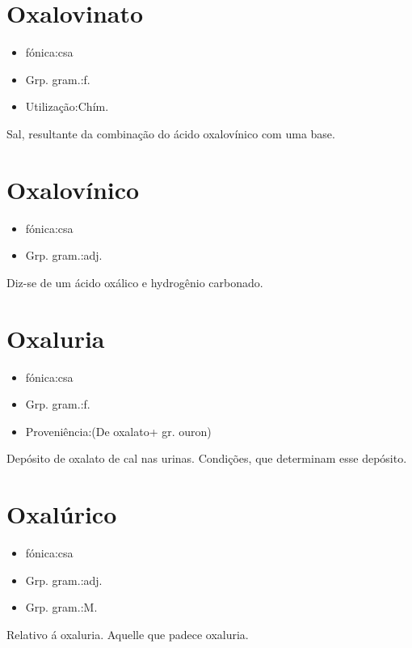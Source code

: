 \section{Oxalovinato}
\begin{itemize}
\item {fónica:csa}
\end{itemize}
\begin{itemize}
\item {Grp. gram.:f.}
\end{itemize}
\begin{itemize}
\item {Utilização:Chím.}
\end{itemize}
Sal, resultante da combinação do ácido oxalovínico com uma base.
\section{Oxalovínico}
\begin{itemize}
\item {fónica:csa}
\end{itemize}
\begin{itemize}
\item {Grp. gram.:adj.}
\end{itemize}
Diz-se de um ácido oxálico e hydrogênio carbonado.
\section{Oxaluria}
\begin{itemize}
\item {fónica:csa}
\end{itemize}
\begin{itemize}
\item {Grp. gram.:f.}
\end{itemize}
\begin{itemize}
\item {Proveniência:(De \textunderscore oxalato\textunderscore  + gr. \textunderscore ouron\textunderscore )}
\end{itemize}
Depósito de oxalato de cal nas urinas.
Condições, que determinam esse depósito.
\section{Oxalúrico}
\begin{itemize}
\item {fónica:csa}
\end{itemize}
\begin{itemize}
\item {Grp. gram.:adj.}
\end{itemize}
\begin{itemize}
\item {Grp. gram.:M.}
\end{itemize}
Relativo á oxaluria.
Aquelle que padece oxaluria.
